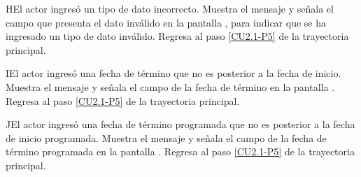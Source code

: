 	\begin{UCtrayectoriaA}{H}{El actor ingresó un tipo de dato incorrecto.}
		\UCpaso[\UCsist] Muestra el mensaje  y señala el campo que presenta el dato inválido en la pantalla , para indicar que se ha ingresado un tipo de dato inválido.
		\UCpaso Regresa al paso \ref{CU2.1-P5} de la trayectoria principal.
	\end{UCtrayectoriaA}

	\begin{UCtrayectoriaA}{I}{El actor ingresó una fecha de término que no es posterior a la fecha de inicio.}
		\UCpaso[\UCsist] Muestra el mensaje  y señala el campo de la fecha de término en la pantalla .
		\UCpaso Regresa al paso \ref{CU2.1-P5} de la trayectoria principal.
	\end{UCtrayectoriaA}

	\begin{UCtrayectoriaA}{J}{El actor ingresó una fecha de término programada que no es posterior a la fecha de inicio programada.}
		\UCpaso[\UCsist] Muestra el mensaje  y señala el campo de la fecha de término programada en la pantalla .
		\UCpaso Regresa al paso \ref{CU2.1-P5} de la trayectoria principal.
	\end{UCtrayectoriaA}